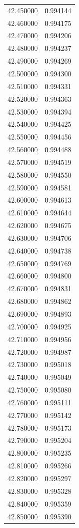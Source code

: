 \begin{tabular}{rr}
42.450000 & 0.994144 \\
42.460000 & 0.994175 \\
42.470000 & 0.994206 \\
42.480000 & 0.994237 \\
42.490000 & 0.994269 \\
42.500000 & 0.994300 \\
42.510000 & 0.994331 \\
42.520000 & 0.994363 \\
42.530000 & 0.994394 \\
42.540000 & 0.994425 \\
42.550000 & 0.994456 \\
42.560000 & 0.994488 \\
42.570000 & 0.994519 \\
42.580000 & 0.994550 \\
42.590000 & 0.994581 \\
42.600000 & 0.994613 \\
42.610000 & 0.994644 \\
42.620000 & 0.994675 \\
42.630000 & 0.994706 \\
42.640000 & 0.994738 \\
42.650000 & 0.994769 \\
42.660000 & 0.994800 \\
42.670000 & 0.994831 \\
42.680000 & 0.994862 \\
42.690000 & 0.994893 \\
42.700000 & 0.994925 \\
42.710000 & 0.994956 \\
42.720000 & 0.994987 \\
42.730000 & 0.995018 \\
42.740000 & 0.995049 \\
42.750000 & 0.995080 \\
42.760000 & 0.995111 \\
42.770000 & 0.995142 \\
42.780000 & 0.995173 \\
42.790000 & 0.995204 \\
42.800000 & 0.995235 \\
42.810000 & 0.995266 \\
42.820000 & 0.995297 \\
42.830000 & 0.995328 \\
42.840000 & 0.995359 \\
42.850000 & 0.995390 \\

\end{tabular}
